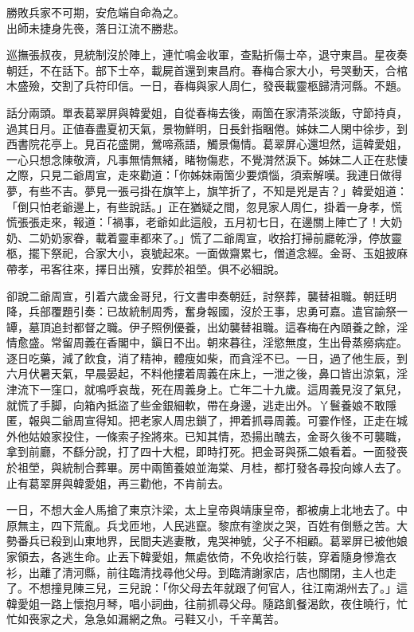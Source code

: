 \begin{myquote}
勝敗兵家不可期，安危端自命為之。\\出師未捷身先䘮，落日江流不勝悲。
\end{myquote}

巡撫張叔夜，見統制沒於陣上，連忙鳴金收軍，查點折傷士卒，退守東昌。星夜奏朝廷，不在話下。部下士卒，載屍首還到東昌府。春梅合家大小，号哭動天，合棺木盛殮，交割了兵符印信。一日，春梅與家人周仁，發䘮載靈柩歸清河縣。不題。

話分兩頭。單表葛翠屏與韓愛姐，自從春梅去後，兩箇在家清茶淡飯，守節持貞，過其日月。正値春盡夏初天氣，景物鮮明，日長針指睏倦。姊妹二人閑中徐步，到西書院花亭上。見百花盛開，鶯啼燕語，觸景傷情。葛翠屏心還坦然，這韓愛姐，一心只想念陳敬濟，凡事無情無緒，睹物傷悲，不覺潸然淚下。{}姊妹二人正在悲悽之際，只見二爺周宣，走來勸道：「你姊妹兩箇少要煩惱，須索解嘆。我連日做得夢，有些不吉。夢見一張弓掛在旗竿上，旗竿折了，不知是兇是吉？」韓愛姐道：「倒只怕老爺邊上，有些說話。」正在猶疑之間，忽見家人周仁，掛着一身孝，慌慌張張走來，報道：「禍事，老爺如此這般，五月初七日，在邊關上陣亡了！大奶奶、二奶奶家眷，載着靈車都來了。」慌了二爺周宣，收拾打掃前廳乾淨，停放靈柩，擺下祭祀，合家大小，哀號起來。一面做齋累七，僧道念經。金哥、玉姐披麻帶孝，弔客往來，擇日出殯，安葬於祖塋。俱不必細說。

卻說二爺周宣，引着六歲金哥兒，行文書申奏朝廷，討祭葬，襲替祖職。朝廷明降，兵部覆題引奏：已故統制周秀，奮身報國，沒於王事，忠勇可嘉。遣官諭祭一罈，墓頂追封都督之職。伊子照例優養，出幼襲替祖職。這春梅在內頤養之餘，淫情愈盛。常留周義在香閣中，鎭日不出。朝來暮往，淫慾無度，生出骨蒸癆病症。逐日吃藥，減了飲食，消了精神，體瘦如柴，而貪淫不已。一日，過了他生辰，到六月伏暑天氣，早晨晏起，不料他摟着周義在床上，一泄之後，{}鼻口皆出涼氣，淫津流下一窪口，就鳴呼哀哉，死在周義身上。亡年二十九歲。{}這周義見沒了氣兒，就慌了手脚，向箱內抵盜了些金銀細軟，帶在身邊，逃走出外。丫鬟養娘不敢隱匿，報與二爺周宣得知。把老家人周忠鎖了，押着抓尋周義。可霎作怪，正走在城外他姑娘家投住，一條索子拴將來。已知其情，恐揚出醜去，金哥久後不可襲職，拿到前廳，不繇分說，打了四十大棍，即時打死。{}把金哥與孫二娘看着。一面發䘮於祖塋，與統制合葬畢。房中兩箇養娘並海棠、月桂，都打發各尋投向嫁人去了。止有葛翠屏與韓愛姐，再三勸他，不肯前去。

一日，不想大金人馬搶了東京汴梁，太上皇帝與靖康皇帝，都被虜上北地去了。中原無主，四下荒亂。兵戈匝地，人民逃竄。黎庶有塗炭之哭，百姓有倒懸之苦。大勢番兵已殺到山東地界，民間夫逃妻散，鬼哭神號，父子不相顧。葛翠屏已被他娘家領去，各逃生命。止丟下韓愛姐，無處依倚，不免收拾行裝，穿着隨身慘澹衣衫，出離了清河縣，前往臨清找尋他父母。到臨清謝家店，店也關閉，主人也走了。不想撞見陳三兒，三兒說：「你父母去年就跟了何官人，往江南湖州去了。」這韓愛姐一路上懷抱月琴，唱小詞曲，往前抓尋父母。隨路飢餐渴飲，夜住曉行，忙忙如䘮家之犬，急急如漏網之魚。弓鞋又小，千辛萬苦。

